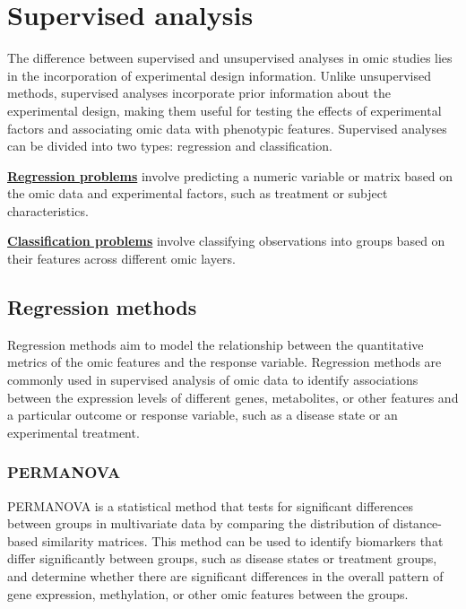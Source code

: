 \documentclass[
]{book}
\begin{document}
\hypertarget{supervised-analysis}{%
\chapter{Supervised analysis}\label{supervised-analysis}}

The difference between supervised and unsupervised analyses in omic studies lies in the incorporation of experimental design information. Unlike unsupervised methods, supervised analyses incorporate prior information about the experimental design, making them useful for testing the effects of experimental factors and associating omic data with phenotypic features. Supervised analyses can be divided into two types: regression and classification.

\textbf{\protect\hyperlink{regression-methods}{Regression problems}} involve predicting a numeric variable or matrix based on the omic data and experimental factors, such as treatment or subject characteristics.

\textbf{\protect\hyperlink{classification-methods}{Classification problems}} involve classifying observations into groups based on their features across different omic layers.

\hypertarget{regression-methods}{%
\section{Regression methods}\label{regression-methods}}

Regression methods aim to model the relationship between the quantitative metrics of the omic features and the response variable. Regression methods are commonly used in supervised analysis of omic data to identify associations between the expression levels of different genes, metabolites, or other features and a particular outcome or response variable, such as a disease state or an experimental treatment.

\hypertarget{permanova}{%
\subsection{PERMANOVA}\label{permanova}}

PERMANOVA is a statistical method that tests for significant differences between groups in multivariate data by comparing the distribution of distance-based similarity matrices. This method can be used to identify biomarkers that differ significantly between groups, such as disease states or treatment groups, and determine whether there are significant differences in the overall pattern of gene expression, methylation, or other omic features between the groups.
\end{document}
